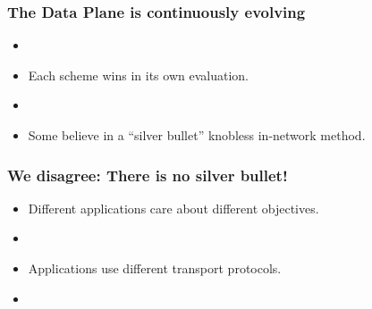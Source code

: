 \begin{Large}
\begin{frame}[plain]
\end{frame}


\begin{frame}[plain]
\frametitle{The Data Plane is continuously evolving}
\begin{itemize}
\item[]
\item Each scheme wins in its own evaluation.
\item[]
\item Some believe in a ``silver bullet'' knobless in-network method.
\end{itemize}
\end{frame}

\begin{frame}[plain]
\frametitle{We disagree: There is no silver bullet!}
\begin{itemize}
\item{Different applications care about different objectives.}
\item[]

\item{Applications use different transport protocols.}
\item[]


\end{itemize}
\end{frame}
\end{Large}
